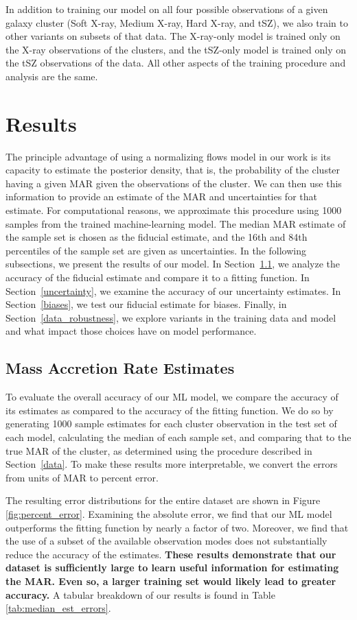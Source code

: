 \documentclass[twocolumn, linenumbers, 11pt]{aastex63}%
\begin{document}
In addition to training our model on all four possible observations of a given galaxy cluster (Soft X-ray, Medium X-ray, Hard X-ray, and tSZ), we also train to other variants on subsets of that data. The X-ray-only model is trained only on the X-ray observations of the clusters, and the tSZ-only model is trained only on the tSZ observations of the data. All other aspects of the training procedure and analysis are the same.

\section{Results}\label{results}
The principle advantage of using a normalizing flows model in our work is its capacity to estimate the posterior density, that is, the probability of the cluster having a given MAR given the observations of the cluster. We can then use this information to provide an estimate of the MAR and uncertainties for that estimate. For computational reasons, we approximate this procedure using 1000 samples from the trained machine-learning model. The median MAR estimate of the sample set is chosen as the fiducial estimate, and the 16th and 84th percentiles of the sample set are given as uncertainties. In the following subsections, we present the results of our model. In Section~\ref{accuracy}, we analyze the accuracy of the fiducial estimate and compare it to a fitting function. In Section~\ref{uncertainty}, we examine the accuracy of our uncertainty estimates. In Section~\ref{biases}, we test our fiducial estimate for biases. Finally, in Section~\ref{data_robustness}, we explore variants in the training data and model and what impact those choices have on model performance.

\subsection{Mass Accretion Rate Estimates}\label{accuracy}
To evaluate the overall accuracy of our ML model, we compare the accuracy of its estimates as compared to the accuracy of the fitting function. We do so by generating 1000 sample estimates for each cluster observation in the test set of each model, calculating the median of each sample set, and comparing that to the true MAR of the cluster, as determined using the procedure described in Section~\ref{data}. To make these results more interpretable, we convert the errors from units of MAR to percent error.

The resulting error distributions for the entire dataset are shown in Figure \ref{fig:percent_error}. Examining the absolute error, we find that our ML model outperforms the fitting function by nearly a factor of two. Moreover, we find that the use of a subset of the available observation modes does not substantially reduce the accuracy of the estimates. \textbf{These results demonstrate that our dataset is sufficiently large to learn useful information for estimating the MAR. Even so, a larger training set would likely lead to greater accuracy.} A tabular breakdown of our results is found in Table \ref{tab:median_est_errors}.
\end{document}
